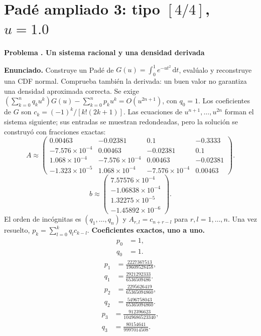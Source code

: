 \documentclass[11pt,a4paper]{article}
\newcommand{\dd}{\,\mathrm d}
\theoremstyle{definition}
\newcounter{problema}
\newenvironment{resuelto}[1]{\refstepcounter{problema}\par\medskip\Needspace{6\baselineskip}\textbf{Problema \theproblema. #1}\par}{\par\medskip}
\begin{document}
\section{\texorpdfstring{Padé ampliado 3: tipo $[4/4]$, $u=1.0$}{Padé ampliado 3: tipo [4/4], u=1.0}}
\begin{resuelto}{Un sistema racional y una densidad derivada}
\textbf{Enunciado.} Construye un Padé de $G(u)=\int_0^1e^{-ut^2}\dd t$, evalúalo y reconstruye una CDF normal. Comprueba también la derivada: un buen valor no garantiza una densidad aproximada correcta.
Se exige $(\sum_{k=0}^{n}q_ku^k)G(u)-\sum_{k=0}^{n}p_ku^k=O(u^{2n+1})$, con $q_0=1$. Los coeficientes de $G$ son $c_k=(-1)^k/[k!(2k+1)]$.
Las ecuaciones de $u^{n+1},\ldots,u^{2n}$ forman el sistema siguiente; sus entradas se muestran redondeadas, pero la solución se construyó con fracciones exactas:
{\small
\[
A\approx\begin{pmatrix}0.00463&-0.02381&0.1&-0.3333\\-7.576\times10^{-4}&0.00463&-0.02381&0.1\\1.068\times10^{-4}&-7.576\times10^{-4}&0.00463&-0.02381\\-1.323\times10^{-5}&1.068\times10^{-4}&-7.576\times10^{-4}&0.00463\end{pmatrix}.
\]
\[
b\approx\begin{pmatrix}7.57576\times10^{-4}\\-1.06838\times10^{-4}\\1.32275\times10^{-5}\\-1.45892\times10^{-6}\end{pmatrix}.
\]
}
El orden de incógnitas es $(q_1,\ldots,q_n)$ y $A_{r,l}=c_{n+r-l}$ para $r,l=1,\ldots,n$. Una vez resuelto, $p_k=\sum_{l=0}^{k}q_lc_{k-l}$.
\textbf{Coeficientes exactos, uno a uno.}
\[
\begin{aligned}p_0&=1,\\q_0&=1.\end{aligned}
\]
\[
\begin{aligned}p_1&=\frac{2227367513}{19609528458},\\q_1&=\frac{2921292333}{6536509486}.\end{aligned}
\]
\[
\begin{aligned}p_2&=\frac{2295626419}{65365094860},\\q_2&=\frac{5496758043}{65365094860}.\end{aligned}
\]
\[
\begin{aligned}p_3&=\frac{912396623}{1049686523340},\\q_3&=\frac{80154641}{9997014508}.\end{aligned}
\]
\end{resuelto}
\end{document}
